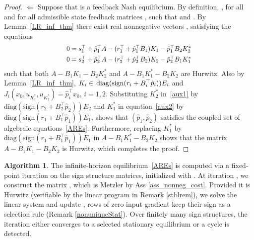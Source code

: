 \documentclass[letterpaper, 10 pt, conference]{ieeeconf}
\theoremstyle{definition}
\newtheorem{alg}{Algorithm}
\begin{document}
\begin{proof}
$\Longleftarrow$ Suppose that  is a feedback Nash equilibrium. By definition, ,   for all  and for all admissible state feedback matrices , such that  and . By Lemma~\ref{LR_inf_thm} there exist real nonnegative vectors , satisfying the equations
\begin{align}\label{aux1}
    \scalebox{.94}{$0=s_1^{\top}+ \hat p_1^{\top}A-(r_1^{\top}+ \hat p_1^{\top}B_1)K_1-
    \hat p_1^{\top}B_2 K^*_2$}\\
    \scalebox{.94}{$0=s_2^{\top}+ \hat p_2^{\top}A-(r_2^{\top}+ \hat p_2^{\top}B_2)K_2-
    \hat p_2^{\top}B_1 K^*_1$}
    \label{aux2}
\end{align}
such that both $A-B_1K_1-B_2K^*_2$ and $A-B_1K^*_1-B_2K_2$ are Hurwitz. Also by Lemma~\ref{LR_inf_thm}, $K_i \in \hspace{0.5mm}\mathrm{diag}(\mathrm{sign}(r_i+B^{\top}_i \hat p_i))E_i$ and $J_i(x_0, u_{K_1^*}, u_{K_2^*})=\hat p_i^{\top}x_0$, $i=1,2$. Substituting $K_2^*$ in~\eqref{aux1} by $\mathrm{diag}(\mathrm{sign}(r_2+B^{\top}_2 \hat p_2))E_2$ and $K_1^*$ in equation~\eqref{aux2} by $\mathrm{diag}(\mathrm{sign}(r_1+B^{\top}_1 \hat p_1))E_1$, shows that $(\hat p_1, \hat p_2)$ satisfies the coupled set of algebraic equations~\eqref{AREs}. Furthermore, replacing $K_1^*$ by $\mathrm{diag}(\mathrm{sign}(r_1+B^{\top}_1 \hat p_1))E_1$ in $A-B_1K^*_1-B_2K_2$ shows that the matrix $A-B_1K_1-B_2K_2$ is Hurwitz, which completes the proof.
\end{proof}
\begin{alg}\label{rem:fp}
    \vspace{-1mm}
    The infinite-horizon equilibrium~\eqref{AREs} is computed via a fixed-point iteration on the sign structure matrices, initialized with . At iteration \scalebox{.95}{$\ell$}, we construct the matrix , which is Metzler by Ass \ref{ass_nonneg_cost}. Provided it is Hurwitz (verifiable by the linear program in Remark \ref{stblrem}), we solve the linear system  and update , rows of zero input gradient keep their sign as a selection rule (Remark \ref{nonuniqueStat}). Over finitely many sign structures, the iteration either converges to a selected stationary equilibrium or a cycle is detected.
    \vspace{-0.7mm}
\end{alg}
\end{document}
